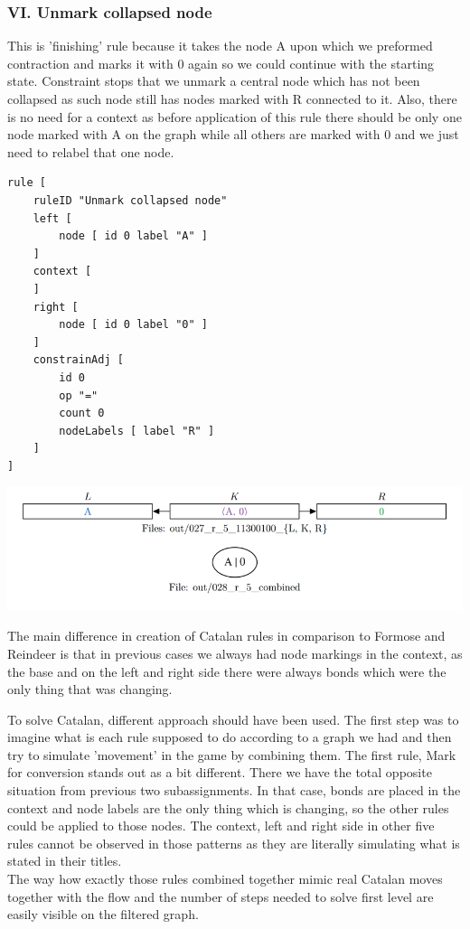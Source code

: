 \documentclass[a4paper,10pt,titlepage]{report}
\begin{document}
\subsubsection{VI. Unmark collapsed node}

This is 'finishing' rule because it takes the node A upon which we preformed contraction and marks it with 0 again so we could continue with the starting state. Constraint stops that we unmark a central node which has not been collapsed as such node still has nodes marked with R connected to it. Also, there is no need for a context as before application of this rule there should be only one node marked with A on the graph while all others are marked with 0 and we just need to relabel that one node. 

\begin{lstlisting}
rule [
	ruleID "Unmark collapsed node"
	left [
		node [ id 0 label "A" ]
	]
	context [
	]
	right [
		node [ id 0 label "0" ]
	]
	constrainAdj [
		id 0
		op "="
		count 0
		nodeLabels [ label "R" ]
	]
]
\end{lstlisting}

\vspace{10mm}
\includegraphics[scale=0.7]{vi.png}
\vspace{10mm}

The main difference in creation of Catalan rules in comparison to Formose and Reindeer is that in previous cases we always had node markings in the context, as the base and on the left and right side there were always bonds which were the only thing that was changing. 

To solve Catalan, different approach should have been used. The first step was to imagine what is each rule supposed to do according to a graph we had and then try to simulate 'movement' in the game by combining them. The first rule, Mark for conversion stands out as a bit different. There we have the total opposite situation from previous two subassignments. In that case, bonds are placed in the context and node labels are the only thing which is changing, so the other rules could be applied to those nodes. The context, left and right side in other five rules cannot be observed in those patterns as they are literally simulating what is stated in their titles.
\\
The way how exactly those rules combined together mimic real Catalan moves together with the flow and the number of steps needed to solve first level are easily visible on the filtered graph. 
\end{document}
